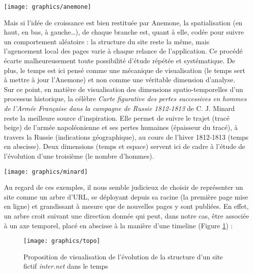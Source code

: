 \documentclass[symmetric,justified,marginals=raggedouter]{tufte-book}
\begin{document}
\begin{figure*}
  \texttt{[image: graphics/anemone]}
  \caption{Fonctionnement du système de visualisation Anemone, pour un site fictif \textit{inter.net}}
  \label{fig:anemone}
\end{figure*}

\noindent Mais si l'idée de croissance est bien restituée par Anemone, la spatialisation (en haut, en bas, à gauche\ldots{}), de chaque branche est, quant à elle, codée pour suivre un comportement aléatoire : la structure du site reste la même, mais l'agencement local des pages varie à chaque relance de l'application. Ce procédé écarte malheureusement toute possibilité d'étude répétée et systématique. De plus, le temps est ici pensé comme une mécanique de visualisation (le temps sert à mettre à jour l'Anemone) et non comme une véritable dimension d'analyse.\\

\noindent Sur ce point, en matière de visualisation des dimensions spatio-tempo\-relles d'un processus historique, la célèbre \textit{Carte figurative des pertes successives en hommes de l'Armée Française dans la campagne de Russie 1812-1813} de C. J. Minard reste la meilleure source d'inspiration. Elle permet de suivre le trajet (tracé beige) de l'armée napoléonienne et ses pertes humaines (épaisseur du tracé), à travers la Russie (indications géographique), au cours de l'hiver 1812-1813 (temps en abscisse). Deux dimensions (temps et espace) servent ici de cadre à l'étude de l'évolution d'une troisième (le nombre d'hommes). 

\newpage

\begin{figure*}
  \texttt{[image: graphics/minard]}
  \caption{C.J. Minard, (1869), Carte figurative des pertes successives en hommes de l'Armée Française dans la campagne de Russie 1812-1813}
  \label{fig:minard}
\end{figure*}

\noindent Au regard de ces exemples, il nous semble judicieux de choisir de représenter un site comme un arbre d'URL, se déployant depuis sa racine (la première page mise en ligne) et grandissant à mesure que de nouvelles pages y sont publiées. En effet, un arbre croit suivant une direction donnée qui peut, dans notre cas, être associée à un axe temporel, placé en abscisse à la manière d'une timeline (Figure \ref{fig:topo}) : 

\begin{figure}
  \texttt{[image: graphics/topo]}
  \caption{Proposition de visualisation de l'évolution de la structure d'un site fictif \textit{inter.net} dans le temps}
  \label{fig:topo}
\end{figure}
\end{document}
